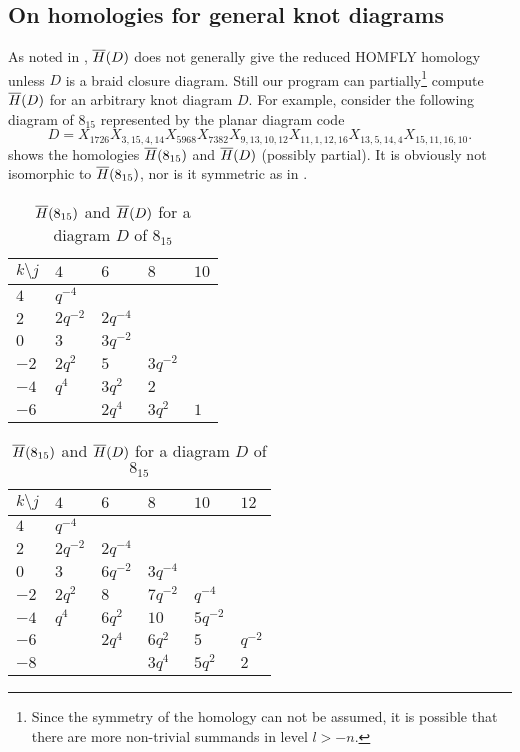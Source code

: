 \subsection{On homologies for general knot diagrams}\label{subsec:generalsym}

As noted in , $\overline{H}(D)$ does not generally give the reduced HOMFLY homology unless $D$ is a braid closure diagram. Still our program can partially\footnote{Since the symmetry of the homology can not be assumed, it is possible that there are more non-trivial summands in level $l > -n$.} compute $\overline{H}(D)$ for an arbitrary knot diagram $D$. 
%
For example, consider the following diagram of $8_{15}$ represented by the planar diagram code \cite{knotinfo,knotatlas}
\[
    D = X_{1726}X_{3,15,4,14}X_{5968}X_{7382}X_{9,13,10,12}X_{11,1,12,16}X_{13,5,14,4}X_{15,11,16,10}.
\]
 shows the homologies $\overline{H}(8_{15})$ and $\overline{H}(D)$ (possibly partial). It is obviously not isomorphic to $\overline{H}(8_{15})$, nor is it symmetric as in .

\begin{table}[h]
\begin{minipage}[t]{.49\linewidth}
\small
\centering
\setlength{\tabcolsep}{2pt}
\begin{tabular}[t]{l|llll}
$k \setminus j$ & $4$ & $6$ & $8$ & $10$ \\
\hline
$4$ & $q^{-4}$ &  &  &  \\
$2$ & $2q^{-2}$ & $2q^{-4}$ &  &  \\
$0$ & $3$ & $3q^{-2}$ &  &  \\
$-2$ & $2q^{2}$ & $5$ & $3q^{-2}$ &  \\
$-4$ & $q^{4}$ & $3q^{2}$ & $2$ &  \\
$-6$ &  & $2q^{4}$ & $3q^{2}$ & $1$ \\
\end{tabular}
\end{minipage}
\begin{minipage}[t]{.49\linewidth}
\small
\centering
\setlength{\tabcolsep}{2pt}
\begin{tabular}[t]{l|lllll}
$k \setminus j$ & $4$ & $6$ & $8$ & $10$ & $12$ \\
\hline
$4$ & $q^{-4}$ & & & & \\
$2$ & $2q^{-2}$ & $2q^{-4}$ & & & \\
$0$ & $3$ & $6q^{-2}$ & $3q^{-4}$ & & \\
$-2$ & $2q^2$ & $8$ & $7q^{-2}$ & $q^{-4}$ & \\
$-4$ & $q^4$ & $6q^2$ & $10$ & $5q^{-2}$ & \\
$-6$ & & $2q^4$ & $6q^2$ & $5$ & $q^{-2}$ \\
$-8$ & & & $3q^4$ & $5q^2$ & $2$ \\
\end{tabular}
\end{minipage}
\caption{$\overline{H}(8_{15})$ and $\overline{H}(D)$ for a diagram $D$ of $8_{15}$}
\label{table:815}
\end{table}

